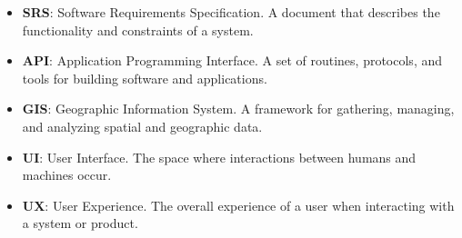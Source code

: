 \documentclass[a4paper,12pt]{article}
\begin{document}
\begin{itemize}
    \item \textbf{SRS}: Software Requirements Specification. A document that describes the functionality and constraints of a system.
    \item \textbf{API}: Application Programming Interface. A set of routines, protocols, and tools for building software and applications.
    \item \textbf{GIS}: Geographic Information System. A framework for gathering, managing, and analyzing spatial and geographic data.
    \item \textbf{UI}: User Interface. The space where interactions between humans and machines occur.
    \item \textbf{UX}: User Experience. The overall experience of a user when interacting with a system or product.
\end{itemize}
\end{document}
